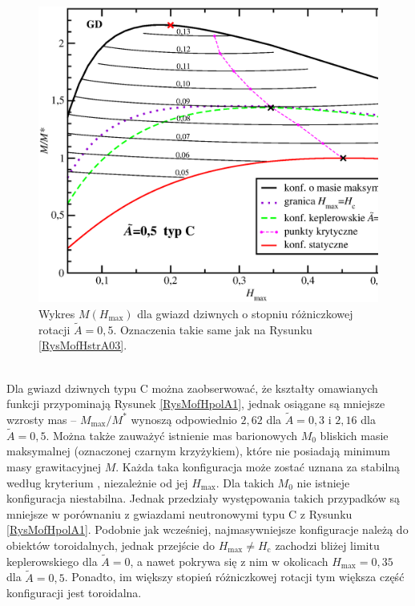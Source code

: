 \documentclass{bachelor_thesis}
\begin{document}
            \begin{figure}[h!]
            \centering
            \includegraphics[scale=.49]{figures/RysMofHstrA05.eps}
            \caption{Wykres $M(H_\textrm{max})$ dla gwiazd dziwnych o stopniu różniczkowej rotacji $\tilde{A}=0,5$. Oznaczenia takie same jak na Rysunku \ref{RysMofHstrA03}.}
            \label{RysMofHstrA05}
            \end{figure}\\
            \indent Dla gwiazd dziwnych typu C można zaobserwować, że kształty omawianych funkcji przypominają Rysunek \ref{RysMofHpolA1}, jednak osiągane są mniejsze wzrosty mas -- $M_\textrm{max}/M^*$ wynoszą odpowiednio $2,62$ dla $\tilde{A}=0,3$ i $2,16$ dla $\tilde{A}=0,5$. Można także zauważyć istnienie mas barionowych $M_0$ bliskich masie maksymalnej (oznaczonej czarnym krzyżykiem), które nie posiadają minimum masy grawitacyjnej $M$. Każda taka konfiguracja może zostać uznana za stabilną według kryterium \cite{Friedman1988}, niezależnie od jej $H_\textrm{max}$. Dla takich $M_0$ nie istnieje konfiguracja niestabilna. Jednak przedziały występowania takich przypadków są mniejsze w porównaniu z gwiazdami neutronowymi typu C z Rysunku \ref{RysMofHpolA1}. Podobnie jak wcześniej, najmasywniejsze konfiguracje należą do obiektów toroidalnych, jednak przejście do $H_\textrm{max}\neq H_\textrm{c}$ zachodzi bliżej limitu keplerowskiego dla $\tilde{A}=0$, a nawet pokrywa się z nim w okolicach $H_\textrm{max}=0,35$ dla $\tilde{A}=0,5$. Ponadto, im większy stopień różniczkowej rotacji tym większa część konfiguracji jest toroidalna.\\
\end{document}
